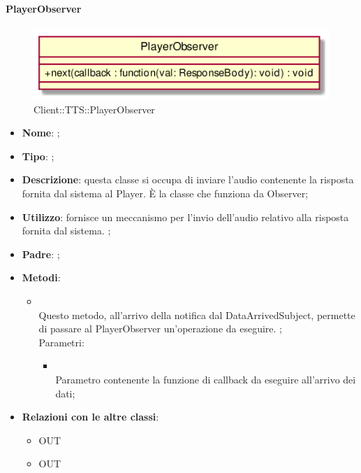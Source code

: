\hypertarget{PlayerObserver_label}{\paragraph{PlayerObserver}}
\begin{figure}[h]
	\centering
	\includegraphics[width=\textwidth,height=\textheight,keepaspectratio]{images/ClassPlayerObserver.png}
	\caption{Client::TTS::PlayerObserver}
\end{figure}
\begin{itemize}
	\item \textbf{Nome}: ;
	\item \textbf{Tipo}: ;
	\item \textbf{Descrizione}: questa classe si occupa di inviare l'audio contenente la risposta fornita dal sistema al Player.
È la classe che funziona da Observer;
	\item \textbf{Utilizzo}: fornisce un meccanismo per l'invio dell'audio relativo alla risposta fornita dal sistema. ;
	\item \textbf{Padre}: ;
	\item \textbf{Metodi}:
	\begin{itemize}
		\item[]  \\
		Questo metodo, all'arrivo della notifica dal DataArrivedSubject, permette di passare al PlayerObserver un'operazione da eseguire. ;\\
		Parametri:
		\begin{itemize}
			\item {} \\
			Parametro contenente la funzione di callback da eseguire all'arrivo dei dati;
		\end{itemize}
	\end{itemize}
	\item \textbf{Relazioni con le altre classi}:
	\begin{itemize}
		\item OUT \hyperlink{Player_label}{}
		\item OUT \hyperlink{DataArrivedObservable_label}{}
	\end{itemize}
\end{itemize}
\FloatBarrier

